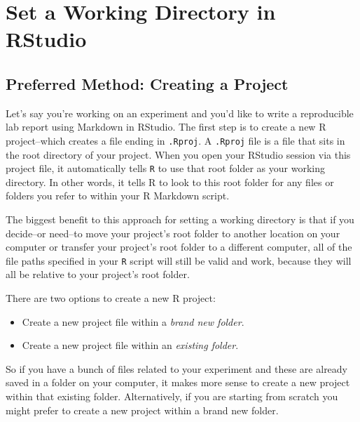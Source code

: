 \documentclass[
]{book}
\providecommand{\tightlist}{%
  \setlength{\itemsep}{0pt}\setlength{\parskip}{0pt}}
\begin{document}
\hypertarget{set-a-working-directory-in-rstudio}{%
\section{Set a Working Directory in RStudio}\label{set-a-working-directory-in-rstudio}}

\hypertarget{preferred-method-creating-a-project}{%
\subsection*{Preferred Method: Creating a Project}\label{preferred-method-creating-a-project}}

Let's say you're working on an experiment and you'd like to write a reproducible lab report using Markdown in RStudio. The first step is to create a new R project--which creates a file ending in \texttt{.Rproj}. A \texttt{.Rproj} file is a file that sits in the root directory of your project. When you open your RStudio session via this project file, it automatically tells \texttt{R} to use that root folder as your working directory. In other words, it tells R to look to this root folder for any files or folders you refer to within your R Markdown script.

The biggest benefit to this approach for setting a working directory is that if you decide--or need--to move your project's root folder to another location on your computer or transfer your project's root folder to a different computer, all of the file paths specified in your \texttt{R} script will still be valid and work, because they will all be relative to your project's root folder.

There are two options to create a new R project:

\begin{itemize}
\tightlist
\item
  Create a new project file within a \emph{brand new folder}.
\item
  Create a new project file within an \emph{existing folder}.
\end{itemize}

So if you have a bunch of files related to your experiment and these are already saved in a folder on your computer, it makes more sense to create a new project within that existing folder. Alternatively, if you are starting from scratch you might prefer to create a new project within a brand new folder.
\end{document}

